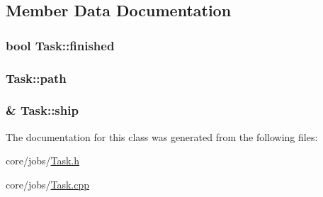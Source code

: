\subsection{Member Data Documentation}
\hypertarget{classTask_a81aa161cc48dc53e86b3d8dfa9d5dfe7}{
\subsubsection[{finished}]{\setlength{\rightskip}{0pt plus 5cm}bool Task\-::finished}}\label{classTask_a81aa161cc48dc53e86b3d8dfa9d5dfe7}
\hypertarget{classTask_a31352b3b35827e5898ceb39332fb1d77}{
\subsubsection[{path}]{ Task\-::path}}\label{classTask_a31352b3b35827e5898ceb39332fb1d77}
\hypertarget{classTask_af765f4e3eab35d064f5cf18506b7c9a2}{
\subsubsection[{ship}]{\& Task\-::ship}}\label{classTask_af765f4e3eab35d064f5cf18506b7c9a2}


The documentation for this class was generated from the following files\-:\begin{DoxyCompactItemize}
\item 
core/jobs/\hyperlink{Task_8h}{Task.\-h}\item 
core/jobs/\hyperlink{Task_8cpp}{Task.\-cpp}\end{DoxyCompactItemize}
